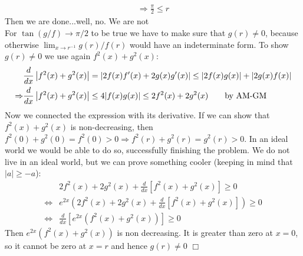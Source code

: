 \begin{solution}[$\pi/2$]
\begin{align*}
        \Rightarrow \frac{\pi}{2} \leq r
    \end{align*}
    Then we are done...well, no. We are not\\
    For $\tan (g/f) \rightarrow \pi/2$ to be true we have to make sure that $g(r) \neq 0$, because otherwise $\lim_{x \rightarrow r^{-1}}g(r)/f(r)$ would have an indeterminate form. To show $g(r) \neq 0$ we use again $f^2(x)+g^2(x)$:\\
    \begin{align*}
        &\frac{d}{dx} \left | f^2(x)+g^2(x) \right| = |2f(x)f'(x)+2g(x)g'(x)| \leq |2f(x)g(x)| + |2g(x)f(x)| \\
        \Rightarrow&\frac{d}{dx} \left | f^2(x)+g^2(x) \right| \leq 4|f(x)g(x)| \leq 2f^2(x)+2g^2(x) \text{\hspace{20pt}by AM-GM}\\
    \end{align*}
    Now we connected the expression with its derivative. If we can show that $f^2(x)+g^2(x)$ is non-decreasing, then $f^2(0)+g^2(0)=f^2(0)>0 \Rightarrow f^2(r)+g^2(r)=g^2(r) >0$. In an ideal world we would be able to do so, successfully finishing the problem. We do not live in an ideal world, but we can prove something cooler (keeping in mind that $|a| \geq -a$):
    \begin{align*}
        &2f^2(x)+2g^2(x)+\frac{d}{dx}\left[ f^2(x)+g^2(x) \right] \geq 0 \\
        \iff &e^{2x} \left( 2f^2(x)+2g^2(x)+\frac{d}{dx}\left[ f^2(x)+g^2(x) \right] \right) \geq 0 \\
        \iff &\frac{d}{dx} \left [ e^{2x}(f^2(x)+g^2(x)) \right ] \geq 0
    \end{align*}
    Then $e^{2x}(f^2(x)+g^2(x))$ is non decreasing. It is greater than zero at $x=0$, so it cannot be zero at $x=r$ and hence $g(r) \neq 0$ $\Box$
\end{solution}

